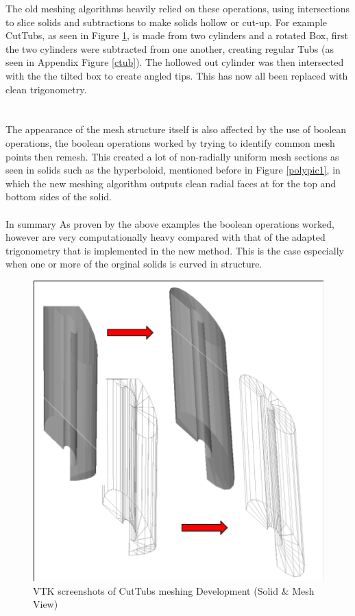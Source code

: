 \documentclass[12pt,a4paper]{article}
\begin{document}
\noindent The old meshing algorithms heavily relied on these operations, using intersections to slice solids and subtractions to make solids hollow or cut-up. For example CutTubs, as seen in Figure \ref{ct}, is made from two cylinders and a rotated Box, first the two cylinders were subtracted from one another, creating regular Tubs (as seen in Appendix Figure \ref{ctub}). The hollowed out cylinder was then intersected with the the tilted box to create angled tips. This has now all been replaced with clean trigonometry.
\\\\\\
The appearance of the mesh structure itself is also affected by the use of boolean operations, the boolean operations worked by trying to identify common mesh points then remesh. This created a lot of non-radially uniform mesh sections as seen in solids such as the hyperboloid, mentioned before in Figure \ref{polypic1}, in which the new meshing algorithm outputs clean radial faces at for the top and bottom sides of the solid.
\\\\
In summary As proven by the above examples the boolean operations worked, however are very computationally heavy compared with that of the adapted trigonometry that is implemented in the new method. This is the case especially when one or more of the orginal solids is curved in structure.

\begin{figure}[h!]
\centering
\includegraphics[scale=0.5]{Images//Meshes//CutTubs.png}
\caption[width=\columnwidth]{VTK screenshots of CutTubs meshing Development (Solid \& Mesh View)}
\label{ct}
\end{figure}
\end{document}
